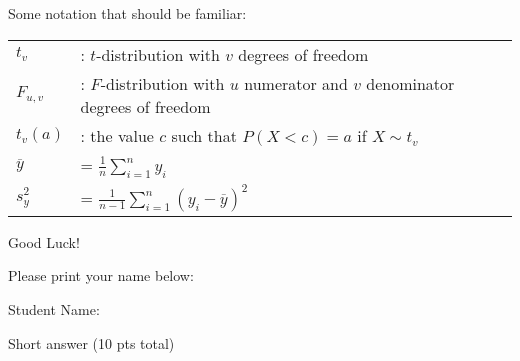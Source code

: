 \documentclass[10pt]{article}
\newcommand{\smallbrk}{\vspace*{.3in}}
\begin{document}
Some notation that should be familiar:
\begin{center}
\begin{tabular}{ll}
$t_v$ &: $t$-distribution with $v$ degrees of freedom \\
$F_{u,v}$ &: $F$-distribution with $u$ numerator and $v$ denominator degrees of freedom \\
$t_{v}(a)$ &: the value $c$ such that $P(X<c)=a$ if $X\sim t_v$ \\
$\overline{y}$ &= $\frac{1}{n} \sum_{i=1}^n y_i$ \\
$s_y^2$ &= $\frac{1}{n-1} \sum_{i=1}^n (y_i-\overline{y})^2$ \\
\end{tabular}
\end{center}

\smallbrk

Good Luck!

\smallbrk

Please print your name below:

\smallbrk


Student Name: \underline{\phantom{XXXXXXXXXXXXXXXXXXXXXXXXXXXXXXXXXXXXXXXXX}}  

\newpage
\noindent \begin{Large}Short answer (10 pts total) \end{Large}

\bigskip
\end{document}
